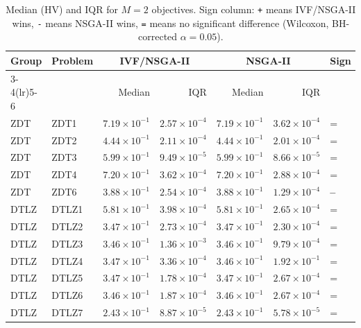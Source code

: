 \begin{table}[t]
\centering
\caption{Median (HV) and IQR for $M=2$ objectives. Sign column: \texttt{+} means IVF/NSGA-II wins, \texttt{-} means NSGA-II wins, \texttt{=} means no significant difference (Wilcoxon, BH-corrected $\alpha=0.05$).}
\label{tab:hv_m2_ivfnsga-ii}
\scriptsize
\begin{tabular}{llrrrrl}
\toprule
Group & Problem & \multicolumn{2}{c}{IVF/NSGA-II} & \multicolumn{2}{c}{NSGA-II} & Sign \\
\cmidrule(lr){3-4}\cmidrule(lr){5-6}
 & & Median & IQR & Median & IQR & \\
\midrule
ZDT & ZDT1 & $7.19\!\times\!10^{-1}$ & $2.57\!\times\!10^{-4}$ & $7.19\!\times\!10^{-1}$ & $3.62\!\times\!10^{-4}$ & = \\
ZDT & ZDT2 & $4.44\!\times\!10^{-1}$ & $2.11\!\times\!10^{-4}$ & $4.44\!\times\!10^{-1}$ & $2.01\!\times\!10^{-4}$ & = \\
ZDT & ZDT3 & $5.99\!\times\!10^{-1}$ & $9.49\!\times\!10^{-5}$ & $5.99\!\times\!10^{-1}$ & $8.66\!\times\!10^{-5}$ & = \\
ZDT & ZDT4 & $7.20\!\times\!10^{-1}$ & $3.62\!\times\!10^{-4}$ & $7.20\!\times\!10^{-1}$ & $2.88\!\times\!10^{-4}$ & = \\
ZDT & ZDT6 & $3.88\!\times\!10^{-1}$ & $2.54\!\times\!10^{-4}$ & $3.88\!\times\!10^{-1}$ & $1.29\!\times\!10^{-4}$ & \textbf{--} \\
\addlinespace
DTLZ & DTLZ1 & $5.81\!\times\!10^{-1}$ & $3.98\!\times\!10^{-4}$ & $5.81\!\times\!10^{-1}$ & $2.65\!\times\!10^{-4}$ & = \\
DTLZ & DTLZ2 & $3.47\!\times\!10^{-1}$ & $2.73\!\times\!10^{-4}$ & $3.47\!\times\!10^{-1}$ & $2.30\!\times\!10^{-4}$ & = \\
DTLZ & DTLZ3 & $3.46\!\times\!10^{-1}$ & $1.36\!\times\!10^{-3}$ & $3.46\!\times\!10^{-1}$ & $9.79\!\times\!10^{-4}$ & = \\
DTLZ & DTLZ4 & $3.47\!\times\!10^{-1}$ & $3.36\!\times\!10^{-4}$ & $3.46\!\times\!10^{-1}$ & $1.92\!\times\!10^{-1}$ & = \\
DTLZ & DTLZ5 & $3.47\!\times\!10^{-1}$ & $1.78\!\times\!10^{-4}$ & $3.47\!\times\!10^{-1}$ & $2.67\!\times\!10^{-4}$ & = \\
DTLZ & DTLZ6 & $3.46\!\times\!10^{-1}$ & $1.87\!\times\!10^{-4}$ & $3.46\!\times\!10^{-1}$ & $2.67\!\times\!10^{-4}$ & = \\
DTLZ & DTLZ7 & $2.43\!\times\!10^{-1}$ & $8.87\!\times\!10^{-5}$ & $2.43\!\times\!10^{-1}$ & $5.78\!\times\!10^{-5}$ & = \\

\end{tabular}
\end{table}
